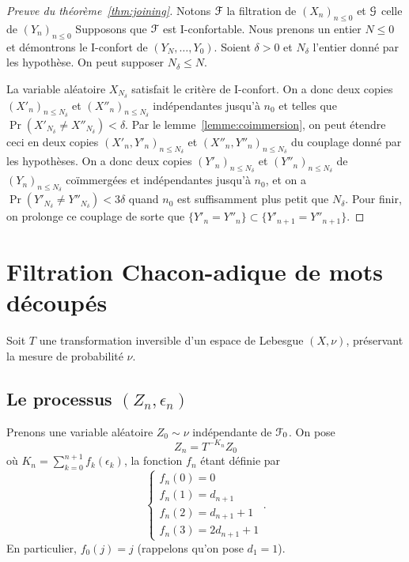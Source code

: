 \documentclass[12pt,a4paper]{article}
\begin{document}
\begin{proof}[Preuve du théorème~\ref{thm:joining}]
Notons $\EuScript{F}$ la filtration de  ${(X_n)}_{n \leq 0}$ et 
$\EuScript{G}$ celle de ${(Y_n)}_{n \leq 0}$
Supposons que $\EuScript{F}$ est I-confortable.
Nous prenons un entier $N \leq 0$ et démontrons le I-confort de 
$(Y_N, \ldots, Y_0)$.  
Soient $\delta >0$ et $N_\delta$ l'entier donné par les hypothèse. 
On peut supposer $N_\delta \leq N$. 

La variable aléatoire $X_{N_\delta}$ satisfait le critère de I-confort. 
On a donc deux copies ${(X'_n)}_{n \leq N_\delta}$ et ${(X''_n)}_{n \leq N_\delta}$ 
indépendantes jusqu'à $n_0$ et telles que $\Pr(X'_{N_\delta} \neq X''_{N_\delta}) < \delta$. 
Par le lemme~\ref{lemme:coimmersion}, on peut étendre ceci 
en deux copies  ${(X'_n, Y'_n)}_{n \leq N_\delta}$ et ${(X''_n, Y''_n)}_{n \leq N_\delta}$ 
du couplage donné par les hypothèses. 
On a donc  deux copies ${(Y'_n)}_{n \leq N_\delta}$ et ${(Y''_n)}_{n \leq N_\delta}$ 
de ${(Y_n)}_{n \leq N_\delta}$ coïmmergées et indépendantes jusqu'à $n_0$, 
et on a $\Pr(Y'_{N_\delta} \neq Y''_{N_\delta}) < 3\delta$ 
quand $n_0$ est suffisamment plus petit que $N_\delta$. 
Pour finir, on prolonge ce couplage de sorte que 
$\{Y'_n = Y''_n\} \subset \{Y'_{n+1} = Y''_{n+1}\}$.
\end{proof}
\section{Filtration Chacon-adique de mots découpés}

Soit $T$ une transformation inversible d'un espace de Lebesgue $(X,\nu)$, 
préservant la mesure de probabilité $\nu$. 

\subsection{Le processus $(Z_n,\epsilon_n)$}

Prenons une variable aléatoire $Z_0 \sim \nu$ indépendante de $\EuScript{F}_0$. 
On pose 
$$
Z_n = T^{-K_n}Z_0
$$
où $K_n=\sum_{k=0}^{n+1}f_k(\epsilon_k)$, la fonction $f_n$ étant définie par 
$$
\begin{cases}
f_n(0) = 0 \\ 
f_n(1) = d_{n+1} \\ 
f_n(2) = d_{n+1}+1 \\
f_n(3) = 2 d_{n+1} + 1
\end{cases}.
$$
En particulier, $f_0(j)=j$ (rappelons qu'on pose $d_1=1$). 
\end{document}
